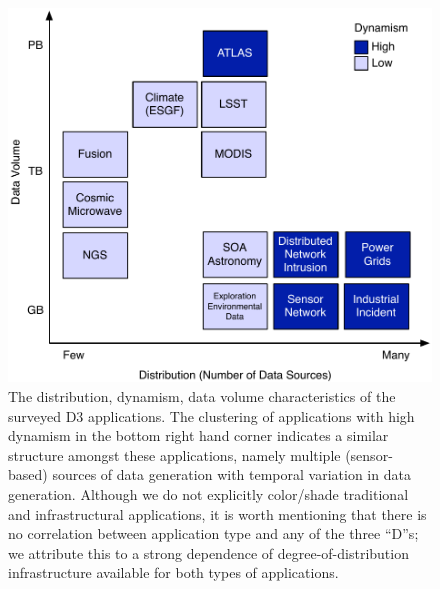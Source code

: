 \begin{figure}[ht]
	\centering
		\includegraphics[width=.7\textwidth]{figures/application.pdf}
                \caption{The distribution, dynamism, data volume
                  characteristics of the surveyed D3 applications. The
                  clustering of applications with high dynamism in the
                  bottom right hand corner indicates a similar
                  structure amongst these applications, namely
                  multiple (sensor-based) sources of data
                  generation with temporal variation in data
                  generation. Although we do not explicitly
                  color/shade traditional and infrastructural
                  applications, it is worth mentioning that there is
                  no correlation between application type and any of
                  the three ``D''s; we attribute this to a strong
                  dependence of degree-of-distribution infrastructure
                  available for both types of applications.
                  \label{fig:figures_application}}
\end{figure}




